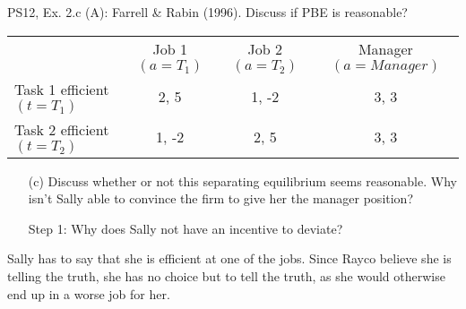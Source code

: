 \begin{frame}{PS12, Ex. 2.c (A): Farrell \& Rabin (1996). Discuss if PBE is reasonable?}
    \begin{table}
      \begin{tabular}{l|c|c|c|}
          \multicolumn{1}{c}{} & \multicolumn{1}{c}{Job 1 $(a=T_1)$} & \multicolumn{1}{c}{Job 2 $(a=T_2)$} & \multicolumn{1}{c}{Manager $(a=Manager)$} \\\cline{2-4}
           Task 1 efficient $(t=T_1)$ & 2, 5 & 1, -2 & 3, 3 \\\cline{2-4}
           Task 2 efficient $(t=T_2)$ & 1, -2 & 2, 5 & 3, 3 \\\cline{2-4}
      \end{tabular}
    \end{table}\vspace{-12pt}
    \begin{itemize}
      \item[(c)] Discuss whether or not this separating equilibrium seems reasonable. Why isn’t Sally able to convince the firm to give her the manager position?
      \item[Step 1:] Why does Sally not have an incentive to deviate?
    \end{itemize}\vspace{-6pt}
    Sally has to say that she is efficient at one of the jobs. Since Rayco believe she is telling the truth, she has no choice but to tell the truth, as she would otherwise end up in a worse job for her.
    \vfill\null
\end{frame}
